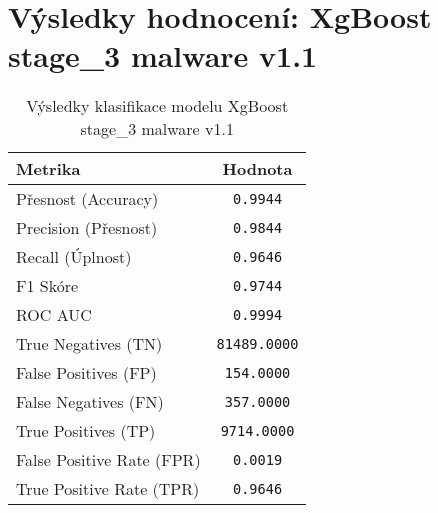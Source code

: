 
\section*{Výsledky hodnocení: XgBoost stage_3 malware v1.1}
\begin{table}[h!]
\centering
\begin{tabular}{|l|c|}
\hline
\textbf{Metrika} & \textbf{Hodnota} \\
\hline
Přesnost (Accuracy) & \texttt{0.9944} \\
Precision (Přesnost) & \texttt{0.9844} \\
Recall (Úplnost) & \texttt{0.9646} \\
F1 Skóre & \texttt{0.9744} \\
ROC AUC & \texttt{0.9994} \\
True Negatives (TN) & \texttt{81489.0000} \\
False Positives (FP) & \texttt{154.0000} \\
False Negatives (FN) & \texttt{357.0000} \\
True Positives (TP) & \texttt{9714.0000} \\
False Positive Rate (FPR) & \texttt{0.0019} \\
True Positive Rate (TPR) & \texttt{0.9646} \\
\hline
\end{tabular}
\caption{Výsledky klasifikace modelu XgBoost stage_3 malware v1.1}
\label{tab:malware_xgboost}
\end{table}

